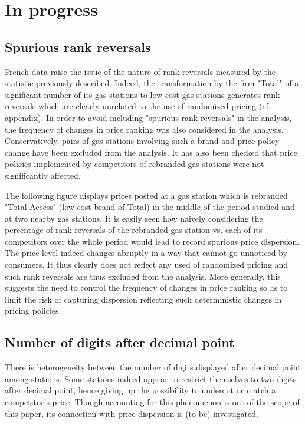 \documentclass[english]{article}
\begin{document}
{{\newpage

\section{In progress}

\subsection{Spurious rank reversals}

French data raise the issue of the nature of rank reversals measured by the statistic previously described. Indeed, the transformation by the firm "Total" of a significant number of its gas stations to low cost gas stations generates rank reversals which are clearly unrelated to the use of randomized pricing (cf. appendix). In order to avoid including "spurious rank reversals" in the analysis, the frequency of changes in price ranking was also considered in the analysis. Conservatively, pairs of gas stations involving such a brand and price policy change have been excluded from the analysis. It has also been checked that price policies implemented by competitors of rebranded gas stations were not significantly affected.

The following figure displays prices posted at a gas station which is rebranded "Total Access" (low cost brand of Total) in the middle of the period studied and at two nearby gas stations. It is easily seen how naively considering the percentage of rank reversals of the rebranded gas station vs. each of its competitors over the whole period would lead to record spurious price dispersion. The price level indeed changes abruptly in a way that cannot go unnoticed by consumers. It thus clearly does not reflect any used of randomized pricing and such rank reversals are thus excluded from the analysis. More generally, this suggests the need to control the frequency of changes in price ranking so as to limit the risk of capturing dispersion reflecting such deterministic changes in pricing policies.

\subsection{Number of digits after decimal point}

There is heterogeneity between the number of digits displayed after decimal point among stations. Some stations indeed appear to restrict themselves to two digits after decimal point, hence giving up the possibility to undercut or match a competitor's price. Though accounting for this phenomenon is out of the scope of this paper, its connection with price dispersion is (to be) investigated.

}}
\end{document}
